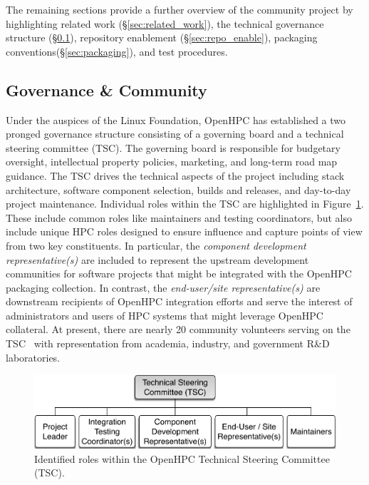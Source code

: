 \documentclass{sig-alternate-05-2015}
\begin{document}
The remaining sections provide a further overview of the community project
by highlighting related work (\S\ref{sec:related_work}), the technical governance
structure (\S\ref{sec:governance}), repository enablement (\S\ref{sec:repo_enable}), packaging
conventions(\S\ref{sec:packaging}), and test procedures.




\subsection{Governance \& Community} \label{sec:governance}
Under the auspices of the Linux Foundation, OpenHPC has established a two
pronged governance structure consisting of a governing board and a technical
steering committee (TSC). The governing board is responsible for budgetary
oversight, intellectual property policies, marketing, and long-term road map
guidance. The TSC drives the technical aspects of the project including stack
architecture, software component selection, builds and releases, and day-to-day
project maintenance. Individual roles within the TSC are highlighted in
Figure~\ref{fig:tsc_governance}.  These include common roles like maintainers
and testing coordinators, but also include unique HPC roles designed to ensure
influence and capture points of view from two key constituents. In particular,
the {\em component development representative(s)} are included to represent the
upstream development communities for software projects that might be integrated
with the OpenHPC packaging collection. In contrast, the {\em end-user/site
  representative(s)} are downstream recipients of OpenHPC integration efforts
and serve the interest of administrators and users of HPC systems that might leverage
OpenHPC collateral.  At present, there are nearly 20 community volunteers
serving on the TSC~\cite{TSC_url} with representation from academia, industry,
and government R\&D laboratories.


\begin{figure}
  \includegraphics[width=1.0\linewidth]{figures/governance}
  \caption{Identified roles within the OpenHPC Technical Steering Committee (TSC).}
  \label{fig:tsc_governance}
\end{figure}
\end{document}
